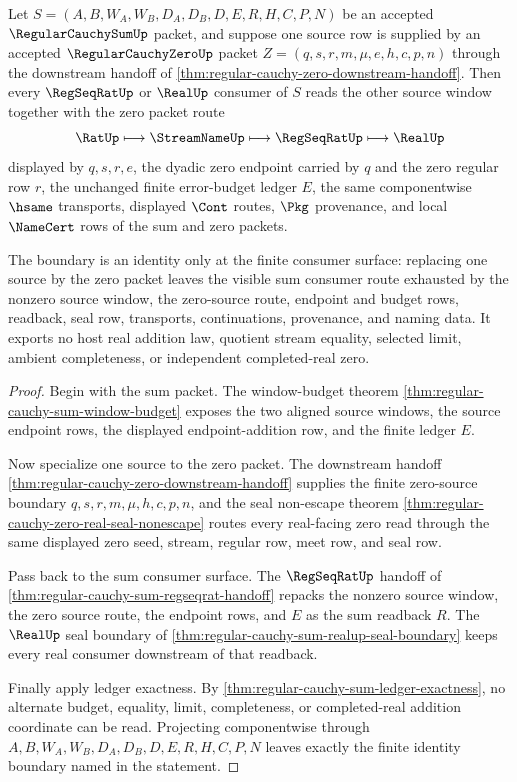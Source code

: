 \begin{theorem}
\label{thm:regular-cauchy-sum-zero-source-identity-boundary}
Let $S=(A,B,W_A,W_B,D_A,D_B,D,E,R,H,C,P,N)$ be an accepted $\RegularCauchySumUp$ packet, and suppose one source row is supplied by an accepted $\RegularCauchyZeroUp$ packet $Z=(q,s,r,m,\mu,e,h,c,p,n)$ through the downstream handoff of \autoref{thm:regular-cauchy-zero-downstream-handoff}. Then every $\RegSeqRatUp$ or $\RealUp$ consumer of $S$ reads the other source window together with the zero packet route
$$
\RatUp \longmapsto \StreamNameUp \longmapsto \RegSeqRatUp \longmapsto \RealUp
$$
displayed by $q,s,r,e$, the dyadic zero endpoint carried by $q$ and the zero regular row $r$, the unchanged finite error-budget ledger $E$, the same componentwise $\hsame$ transports, displayed $\Cont$ routes, $\Pkg$ provenance, and local $\NameCert$ rows of the sum and zero packets.

The boundary is an identity only at the finite consumer surface: replacing one source by the zero packet leaves the visible sum consumer route exhausted by the nonzero source window, the zero-source route, endpoint and budget rows, readback, seal row, transports, continuations, provenance, and naming data. It exports no host real addition law, quotient stream equality, selected limit, ambient completeness, or independent completed-real zero.
\end{theorem}
\begin{proof}
Begin with the sum packet. The window-budget theorem \autoref{thm:regular-cauchy-sum-window-budget} exposes the two aligned source windows, the source endpoint rows, the displayed endpoint-addition row, and the finite ledger $E$.

Now specialize one source to the zero packet. The downstream handoff \autoref{thm:regular-cauchy-zero-downstream-handoff} supplies the finite zero-source boundary $q,s,r,m,\mu,h,c,p,n$, and the seal non-escape theorem \autoref{thm:regular-cauchy-zero-real-seal-nonescape} routes every real-facing zero read through the same displayed zero seed, stream, regular row, meet row, and seal row.

Pass back to the sum consumer surface. The $\RegSeqRatUp$ handoff of \autoref{thm:regular-cauchy-sum-regseqrat-handoff} repacks the nonzero source window, the zero source route, the endpoint rows, and $E$ as the sum readback $R$. The $\RealUp$ seal boundary of \autoref{thm:regular-cauchy-sum-realup-seal-boundary} keeps every real consumer downstream of that readback.

Finally apply ledger exactness. By \autoref{thm:regular-cauchy-sum-ledger-exactness}, no alternate budget, equality, limit, completeness, or completed-real addition coordinate can be read. Projecting componentwise through $A,B,W_A,W_B,D_A,D_B,D,E,R,H,C,P,N$ leaves exactly the finite identity boundary named in the statement.
\end{proof}

